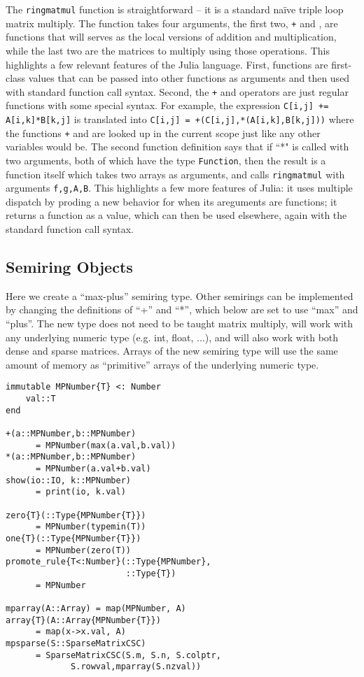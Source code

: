 \documentclass[conference]{IEEEtran}
\begin{document}
The {\tt ringmatmul} function is straightforward -- it is a standard na\"ive triple loop matrix multiply.
The function takes four arguments, the first two, {\tt +} and {\tt *}, are functions that will serves as the local versions of addition and multiplication, while the last two are the matrices to multiply using those operations.
This highlights a few relevant features of the Julia language.
First, functions are first-class values that can be passed into other functions as arguments and then used with standard function call syntax.
Second, the {\tt +} and {\tt *} operators are just regular functions with some special syntax.
For example, the expression {\tt C[i,j] += A[i,k]*B[k,j]} is translated into {\tt C[i,j] = +(C[i,j],*(A[i,k],B[k,j]))} where the functions {\tt +} and {\tt *} are looked up in the current scope just like any other variables would be.
The second function definition says that if ``*"  is called with two arguments, both of which have the type {\tt Function}, then the result is a function itself which takes two arrays as arguments, and calls {\tt ringmatmul} with arguments {\tt f,g,A,B}.
This highlights a few more features of Julia:
it uses multiple dispatch by proding a new behavior for {\tt *} when its areguments are functions;
it returns a function as a value, which can then be used elsewhere, again with the standard function call syntax.

\subsection{Semiring Objects}

Here we create a ``max-plus'' semiring type.  Other semirings can be implemented
by changing the definitions of ``+'' and ``*'', which below are set to use
``max'' and ``plus''.
The new type does not need to be taught matrix multiply, will work with
any underlying numeric type (e.g. int, float, ...), and will also work with
both dense and sparse matrices. Arrays of the new semiring type will use the
same amount of memory as ``primitive'' arrays of the underlying numeric type.


\begin{verbatim}
immutable MPNumber{T} <: Number
    val::T
end

+(a::MPNumber,b::MPNumber)
      = MPNumber(max(a.val,b.val))
*(a::MPNumber,b::MPNumber)
      = MPNumber(a.val+b.val)
show(io::IO, k::MPNumber)
      = print(io, k.val)

zero{T}(::Type{MPNumber{T}})
      = MPNumber(typemin(T))
one{T}(::Type{MPNumber{T}})
      = MPNumber(zero(T))
promote_rule{T<:Number}(::Type{MPNumber},
                        ::Type{T})
      = MPNumber

mparray(A::Array) = map(MPNumber, A)
array{T}(A::Array{MPNumber{T}})
      = map(x->x.val, A)
mpsparse(S::SparseMatrixCSC)
      = SparseMatrixCSC(S.m, S.n, S.colptr,
             S.rowval,mparray(S.nzval))
\end{verbatim}
\end{document}
